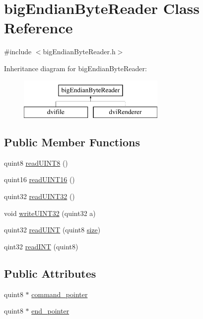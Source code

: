 \hypertarget{classbigEndianByteReader}{\section{big\+Endian\+Byte\+Reader Class Reference}
\label{classbigEndianByteReader}
}


{\ttfamily \#include $<$big\+Endian\+Byte\+Reader.\+h$>$}

Inheritance diagram for big\+Endian\+Byte\+Reader\+:\begin{figure}[H]
\begin{center}
\leavevmode
\includegraphics[height=2.000000cm]{classbigEndianByteReader}
\end{center}
\end{figure}
\subsection*{Public Member Functions}
\begin{DoxyCompactItemize}
\item 
quint8 \hyperlink{classbigEndianByteReader_ac5e3b96e3e09b30dbe57175763077c1f}{read\+U\+I\+N\+T8} ()
\item 
quint16 \hyperlink{classbigEndianByteReader_a870af9d9b5ed04507d392ad2d81c1f53}{read\+U\+I\+N\+T16} ()
\item 
quint32 \hyperlink{classbigEndianByteReader_a39c3b90a7617e40cef20796fbc680df8}{read\+U\+I\+N\+T32} ()
\item 
void \hyperlink{classbigEndianByteReader_ad7b98fdfcac31d1f30b65d2de0f2a97a}{write\+U\+I\+N\+T32} (quint32 a)
\item 
quint32 \hyperlink{classbigEndianByteReader_ace27c2b08d57237a09d84af65891d4b4}{read\+U\+I\+N\+T} (quint8 \hyperlink{synctex__parser_8c_aa23c661441688350614bd6a350d2b6ff}{size})
\item 
qint32 \hyperlink{classbigEndianByteReader_ad85cb1f2cce7f4de7abc632b5e95223b}{read\+I\+N\+T} (quint8)
\end{DoxyCompactItemize}
\subsection*{Public Attributes}
\begin{DoxyCompactItemize}
\item 
quint8 $\ast$ \hyperlink{classbigEndianByteReader_aa8919f6fe116fd3230337675fd23abac}{command\+\_\+pointer}
\item 
quint8 $\ast$ \hyperlink{classbigEndianByteReader_ace2790221530572c87c58f1f77924beb}{end\+\_\+pointer}
\end{DoxyCompactItemize}


